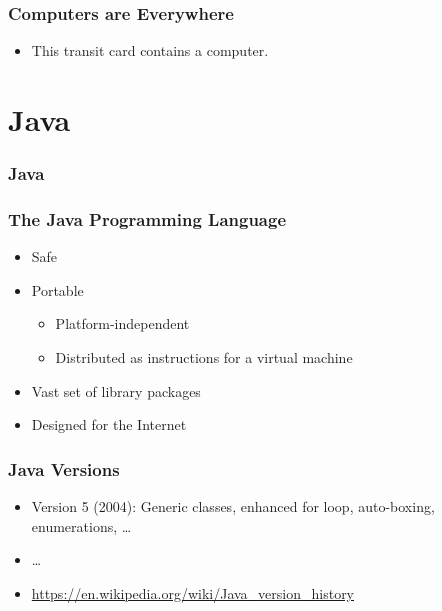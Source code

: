 \documentclass{beamer}
\begin{document}
\begin{frame}[t,fragile] \frametitle{Computers are Everywhere} %
    \begin{itemize}
        \item This transit card contains a computer.
    \end{itemize}
\end{frame}

\section{Java}

\begin{frame}[t,fragile] \frametitle{Java} %
\end{frame}

\begin{frame}[t,fragile] \frametitle{The Java Programming Language} %
    \begin{itemize}
        \item Safe
        \item Portable
        \begin{itemize}
            \item Platform-independent
            \item Distributed as instructions for a virtual machine
        \end{itemize}
        \item Vast set of library packages
        \item Designed for the Internet
    \end{itemize}
\end{frame}

\begin{frame}[t,fragile] \frametitle{Java Versions} %
    \begin{itemize}
        \item Version 5 (2004): Generic classes, enhanced for loop, auto-boxing, enumerations, \ldots
        \item \ldots
        \item \url{https://en.wikipedia.org/wiki/Java_version_history}
    \end{itemize}
\end{frame}
\end{document}
